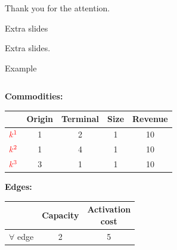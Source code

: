 \documentclass[aspectratio=169]{beamer}
\begin{document}
\begin{frame}[noframenumbering]
\begin{center}
  \Large{Thank you for the attention.}
\end{center}
\end{frame}

\begin{frame}{Extra slides}

Extra slides.

\end{frame}

\begin{frame}{Example}

\begin{columns}
\begin{column}{0.5\textwidth}
\vspace{1cm}

\textbf{Commodities:}
\vspace{-0.5cm}
\begin{table}
\begin{tabular}{ccccc}
& Origin & Terminal & Size & Revenue \\\hline
$\color{red}k^1$ & 1 & 2 & 1 & 10 \\
$\color{red}k^2$ & 1 & 4 & 1 & 10 \\
$\color{red}k^3$ & 3 & 1 & 1 & 10 
\end{tabular}
\end{table}
\bigskip

\textbf{Edges:}
\vspace{-0.5cm}
\begin{table}
\begin{tabular}{ccc}
& Capacity & \makecell{Activation \\ cost} \\\hline
$\forall$ edge & 2 & 5 \\
\end{tabular}
\end{table}
\end{column}


\end{columns}
\end{frame}
\end{document}
